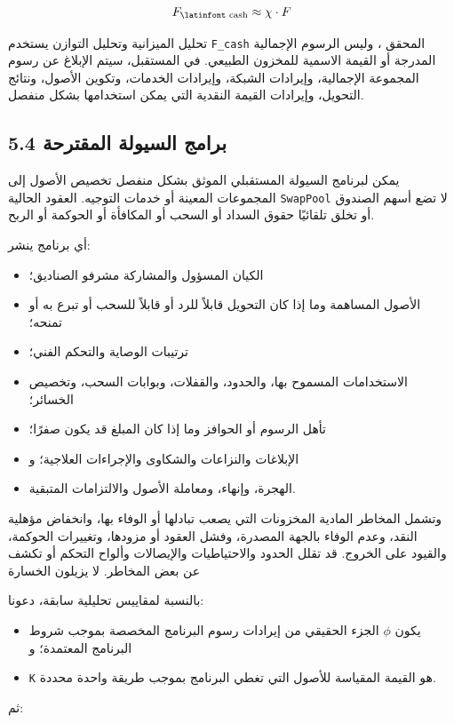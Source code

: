 \documentclass[11pt]{article}
\begin{document}
\[
F_{\text{\latinfont cash}} \approx \chi \cdot F
\]

تحليل الميزانية وتحليل التوازن يستخدم \texttt{F\_cash} المحقق ، وليس الرسوم الإجمالية المدرجة أو القيمة الاسمية للمخزون الطبيعي. في المستقبل، سيتم الإبلاغ عن رسوم المجموعة الإجمالية، وإيرادات الشبكة، وإيرادات الخدمات، وتكوين الأصول، ونتائج التحويل، وإيرادات القيمة النقدية التي يمكن استخدامها بشكل منفصل.

\subsection*{5.4 برامج السيولة المقترحة}

يمكن لبرنامج السيولة المستقبلي الموثق بشكل منفصل تخصيص الأصول إلى المجموعات المعينة أو خدمات التوجيه. العقود الحالية \texttt{SwapPool} لا تضع أسهم الصندوق أو تخلق تلقائيًا حقوق السداد أو السحب أو المكافأة أو الحوكمة أو الربح.

أي برنامج ينشر:

\begin{itemize}[leftmargin=*]
\item الكيان المسؤول والمشاركة مشرفو الصناديق؛
\item الأصول المساهمة وما إذا كان التحويل قابلاً للرد أو قابلاً للسحب أو تبرع به أو تمنحه؛
\item ترتيبات الوصاية والتحكم الفني؛
\item الاستخدامات المسموح بها، والحدود، والقفلات، وبوابات السحب، وتخصيص الخسائر؛
\item تأهل الرسوم أو الحوافز وما إذا كان المبلغ قد يكون صفرًا؛
\item الإبلاغات والنزاعات والشكاوى والإجراءات العلاجية؛ و
\item الهجرة، وإنهاء، ومعاملة الأصول والالتزامات المتبقية.
\end{itemize}
وتشمل المخاطر المادية المخزونات التي يصعب تبادلها أو الوفاء بها، وانخفاض مؤهلية النقد، وعدم الوفاء بالجهة المصدرة، وفشل العقود أو مزودها، وتغييرات الحوكمة، والقيود على الخروج. قد تقلل الحدود والاحتياطيات والإيصالات وألواح التحكم أو تكشف عن بعض المخاطر. لا يزيلون الخسارة

بالنسبة لمقاييس تحليلية سابقة، دعونا:

\begin{itemize}[leftmargin=*]
\item يكون \texttt{$\phi$} الجزء الحقيقي من إيرادات رسوم البرنامج المخصصة بموجب شروط البرنامج المعتمدة؛ و
\item \texttt{K} هو القيمة المقياسة للأصول التي تغطي البرنامج بموجب طريقة واحدة محددة.
\end{itemize}
ثم:
\end{document}
